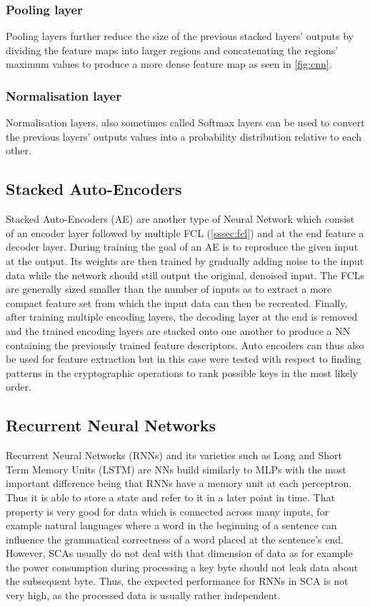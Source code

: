 \documentclass[journal]{IEEEtran}
\begin{document}
\subsubsection{Pooling layer}
Pooling layers further reduce the size of the previous stacked layers' outputs by dividing the feature maps into larger regions and concatenating the regions' maximum values to produce a more dense feature map as seen in \autoref{fig:cnn}.
 
\subsubsection{Normalisation layer}
Normalisation layers, also sometimes called Softmax layers can be used to convert the previous layers' outputs values into a probability distribution relative to each other. 

\subsection{Stacked Auto-Encoders}
Stacked Auto-Encoders (AE) are another type of Neural Network which consist of an encoder layer followed by multiple FCL (\autoref{sssec:fcl}) and at the end feature a decoder layer. During training the goal of an AE is to reproduce the given input at the output. Its weights are then trained by gradually adding noise to the input data while the network should still output the original, denoised input. The FCLs are generally sized smaller than the number of inputs as to extract a more compact feature set from which the input data can then be recreated. Finally, after training multiple encoding layers, the decoding layer at the end is removed and the trained encoding layers are stacked onto one another to produce a NN containing the previously trained feature descriptors. Auto encoders can thus also be used for feature extraction but in this case were tested with respect to finding patterns in the cryptographic operations to rank possible keys in the most likely order. 

\subsection{Recurrent Neural Networks}
Recurrent Neural Networks (RNNs) and its varieties such as Long and Short Term Memory Units (LSTM) are NNs build similarly to MLPs with the most important difference being that RNNs have a memory unit at each perceptron. Thus it is able to store a state and refer to it in a later point in time. That property is very good for data which is connected across many inputs, for example natural languages where a word in the beginning of a sentence can influence the grammatical correctness of a word placed at the sentence's end. However, SCAs usually do not deal with that dimension of data as for example the power consumption during processing a key byte should not leak data about the subsequent byte. Thus, the expected performance for RNNs in SCA is not very high, as the processed data is usually rather independent.
\end{document}
